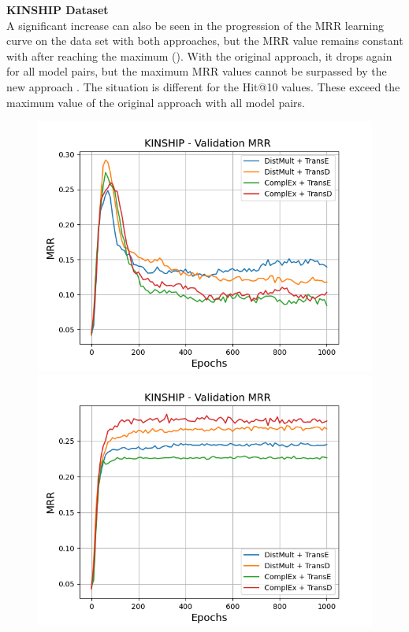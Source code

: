 \textbf{KINSHIP Dataset}
\label{subsubsec:uncertainty_kinship}\\
%
A significant increase can also be seen in the progression of the MRR learning curve on the \kinship data set with both approaches, but the MRR value remains constant with \usgan after reaching the maximum ().
With the original \kbgan approach, it drops again for all model pairs, but the maximum MRR values cannot be surpassed by the new approach \usgan.
The situation is different for the Hit@10 values.
These exceed the maximum value of the original approach with all model pairs.
\begin{figure}[H]
    \centering
    \begin{minipage}{.5\textwidth}
      \centering
      \includegraphics[width=0.9\linewidth]{figures/results/gan_train/not_pretrained/random/kinship/1k_epochs/random_kinship_mrrs.png}
    \end{minipage}%
    \begin{minipage}{.5\textwidth}
      \centering
      \includegraphics[width=0.9\linewidth]{figures/results/gan_train/not_pretrained/uncertainty/max_distribution/entropy/kinship/1k_epochs/uncertainty_kinship_mrrs.png}

\end{minipage}
\end{figure}
